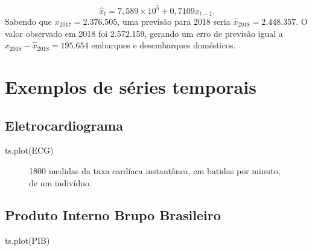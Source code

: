\documentclass[
  letterpaper,
  DIV=11,
  numbers=noendperiod]{scrreprt}
\newenvironment{Shaded}{\begin{snugshade}}{\end{snugshade}}
\newcommand{\FunctionTok}[1]{\textcolor[rgb]{0.28,0.35,0.67}{#1}}
\newcommand{\NormalTok}[1]{\textcolor[rgb]{0.00,0.23,0.31}{#1}}
\theoremstyle{definition}
\theoremstyle{plain}
\theoremstyle{definition}
\theoremstyle{remark}
\begin{document}
\[\hat{x}_t = 7,589\times 10^5 +0,7109 x_{t-1}.\] Sabendo que
\(x_{2017}=2.376.505\), uma previsão para 2018 seria
\(\hat{x}_{2018}=2.448.357\). O valor observado em 2018 foi 2.572.159,
gerando um erro de previsão igual a \(x_{2018}-\hat{x}_{2018}=195.654\)
embarques e desembarques domésticos.

\hypertarget{exemplos-de-suxe9ries-temporais}{%
\section{Exemplos de séries
temporais}\label{exemplos-de-suxe9ries-temporais}}

\hypertarget{eletrocardiograma}{%
\subsection{Eletrocardiograma}\label{eletrocardiograma}}

\begin{Shaded}
\begin{Highlighting}[]
\FunctionTok{ts.plot}\NormalTok{(ECG)}
\end{Highlighting}
\end{Shaded}

\begin{figure}

\begin{minipage}[t]{\linewidth}

{\centering 


\caption{1800 medidas da taxa cardíaca instantânea, em batidas por
minuto, de um indivíduo.}

}

\end{minipage}%

\end{figure}

\hypertarget{produto-interno-brupo-brasileiro}{%
\subsection{Produto Interno Brupo
Brasileiro}\label{produto-interno-brupo-brasileiro}}

\begin{Shaded}
\begin{Highlighting}[]
\FunctionTok{ts.plot}\NormalTok{(PIB)}
\end{Highlighting}
\end{Shaded}
\end{document}
